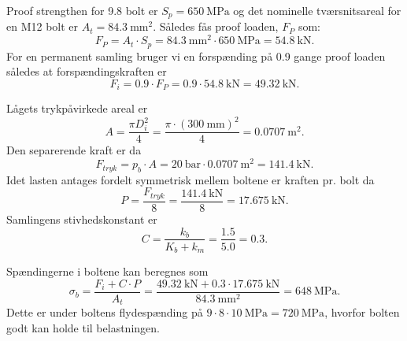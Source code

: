     \begin{derivation}
      Proof strengthen for \num{9,8} bolt er $S_p = \qty{650}{\MPa} $ og det nominelle tværsnitsareal for en M12 bolt er $A_t = \qty{84,3}{\mm^2}$.
      Således fås proof loaden, $F_P$ som:
      \begin{equation*}
        F_P = A_t \cdot S_p = \qty{84,3}{\mm^2} \cdot \qty{650}{\MPa} = \qty{54,8}{\kN}
      .\end{equation*}
      For en permanent samling bruger vi en forspænding på \num{0,9} gange proof loaden således at forspændingskraften er
      \begin{equation*}
        F_i = \num{0,9} \cdot F_P = \num{0,9} \cdot \qty{54,8}{\kN} = \qty{49,32}{\kN}
      .\end{equation*}
      
      Lågets trykpåvirkede areal er
      \begin{equation*}
        A = \frac{\pi D_i^2}{4} = \frac{\pi \cdot \left( \qty{300}{\mm}  \right)^2}{4} = \qty{0,0707}{\m^2} 
      .\end{equation*}
      Den separerende kraft er da
      \begin{equation*}
        F_{tryk} = p_b \cdot A = \qty{20}{\bar} \cdot \qty{0,0707}{\m^2} = \qty{141,4}{\kN} 
      .\end{equation*}
      Idet lasten antages fordelt symmetrisk mellem boltene er kraften pr. bolt da
      \begin{equation*}
        P = \frac{F_{tryk}}{8} = \frac{\qty{141,4}{\kN} }{8} = \qty{17,675}{\kN} 
      .\end{equation*}
      Samlingens stivhedskonstant er
      \begin{equation*}
        C = \frac{k_b}{K_b + k_m} = \frac{\num{1,5}}{\num{5,0}} = \num{0,3}
      .\end{equation*}
      
      Spændingerne i boltene kan beregnes som
      \begin{equation*}
        \sigma_b = \frac{F_i + C\cdot P}{A_t} = \frac{\qty{49,32}{\kN} + \num{0,3} \cdot \qty{17,675}{\kN} }{\qty{84,3}{\mm^2}} = \qty{648}{\MPa}
      .\end{equation*}
      Dette er under boltens flydespænding på $9 \cdot 8 \cdot \qty{10}{\MPa} = \qty{720}{\MPa}$, hvorfor bolten godt kan holde til belastningen.      
    \end{derivation}


